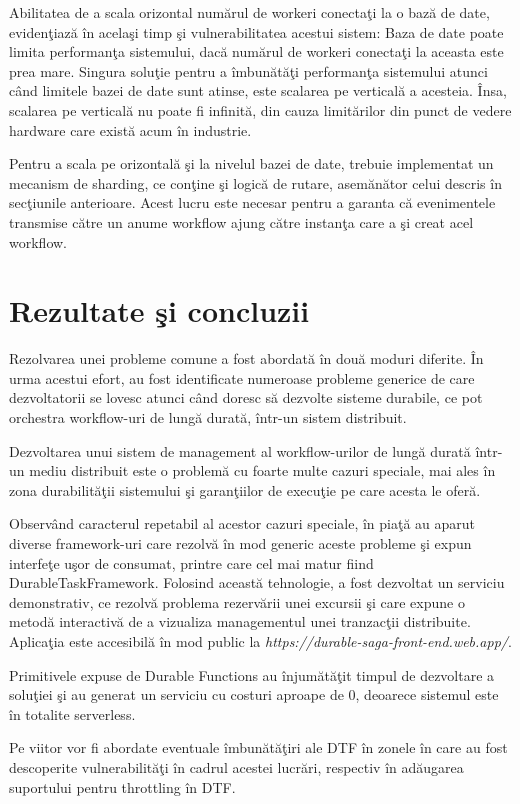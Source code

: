 \par Abilitatea de a scala orizontal numărul de workeri conectaţi la o bază de date, evidenţiază în acelaşi timp şi vulnerabilitatea acestui sistem: Baza de date poate limita performanţa sistemului, dacă numărul de workeri conectaţi la aceasta este prea mare. Singura soluţie pentru a îmbunătăţi performanţa sistemului atunci când limitele bazei de date sunt atinse, este scalarea pe verticală a acesteia. Însa, scalarea pe verticală nu poate fi infinită, din cauza limitărilor din punct de vedere hardware care există acum în industrie. 
\par Pentru a scala pe orizontală şi la nivelul bazei de date, trebuie implementat un mecanism de sharding, ce conţine şi logică de rutare, asemănător celui descris în secţiunile anterioare. Acest lucru este necesar pentru a garanta că evenimentele transmise către un anume workflow ajung către instanţa care a şi creat acel workflow. 
\chapter {Rezultate şi concluzii}
\quad Rezolvarea unei probleme comune a fost abordată în două moduri diferite. În urma acestui efort, au fost identificate numeroase probleme generice de care dezvoltatorii se lovesc atunci când doresc să dezvolte sisteme durabile, ce pot orchestra workflow-uri de lungă durată, într-un sistem distribuit. 
\par Dezvoltarea unui sistem de management al workflow-urilor de lungă durată într-un mediu distribuit este o problemă cu foarte multe cazuri speciale, mai ales în zona durabilităţii sistemului şi garanţiilor de execuţie pe care acesta le oferă. 
\par Observând caracterul repetabil al acestor cazuri speciale, în piaţă au aparut diverse framework-uri care rezolvă în mod generic aceste probleme şi expun interfeţe uşor de consumat, printre care cel mai matur fiind DurableTaskFramework. Folosind această tehnologie, a fost dezvoltat un serviciu demonstrativ, ce rezolvă problema rezervării unei excursii şi care expune o metodă interactivă de a vizualiza managementul unei tranzacţii distribuite. Aplicaţia este accesibilă în mod public la \emph{https://durable-saga-front-end.web.app/}. 
\par Primitivele expuse de Durable Functions au înjumătăţit timpul de dezvoltare a soluţiei şi au generat un serviciu cu costuri aproape de 0, deoarece sistemul este în totalite serverless. 
\par Pe viitor vor fi abordate eventuale îmbunătăţiri ale DTF în zonele în care au fost descoperite vulnerabilităţi în cadrul acestei lucrări, respectiv în adăugarea suportului pentru throttling în DTF.
\listoffigures
{}


